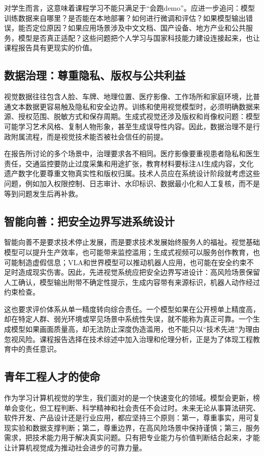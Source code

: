 \documentclass[UTF8,a4paper,12pt]{ctexart}
\begin{document}
对学生而言，这意味着课程学习不能只满足于“会跑demo”。应进一步追问：模型训练数据来自哪里？是否能在本地部署？如何进行微调和评估？如果模型输出错误，能否定位原因？如果应用场景涉及中文文档、国产设备、地方产业和公共服务，模型是否真正适配？这些问题把个人学习与国家科技能力建设连接起来，也让课程报告具有更现实的价值。

\subsection{数据治理：尊重隐私、版权与公共利益}
视觉数据往往包含人脸、车牌、地理位置、医疗影像、工作场所和家庭环境，比普通文本数据更容易触及隐私和安全边界。训练和使用视觉模型时，必须明确数据来源、授权范围、脱敏方式和保存周期。生成式视觉还涉及版权和肖像权问题：模型可能学习艺术风格、复制人物形象，甚至生成误导性内容。因此，数据治理不是行政附属流程，而是视觉技术能否被社会信任的前提。

在报告所讨论的多个场景中，治理要求各不相同。医疗影像要重视患者隐私和医生责任，交通监控要防止过度采集和用途扩张，教育材料要标注AI生成内容，文化遗产数字化要尊重文物真实性和版权归属。技术人员应在系统设计阶段就考虑这些问题，例如加入权限控制、日志审计、水印标识、数据最小化和人工复核，而不是等到问题发生后再补救。

\subsection{智能向善：把安全边界写进系统设计}
智能向善不是要求技术停止发展，而是要求技术发展始终服务人的福祉。视觉基础模型可以提升生产效率，也可能带来监控滥用；生成式视频可以服务创作教育，也可能制造虚假信息；VLA和世界模型可以推动机器人应用，也可能在安全约束不足时造成现实伤害。因此，先进视觉系统应把安全边界写进设计：高风险场景保留人工确认，模型输出附带不确定性提示，生成内容带有来源标识，机器人动作经过约束检查。

这也要求评价体系从单一精度转向综合责任。一个模型如果在公开榜单上精度高，却在特定人群、弱光环境或罕见场景中系统性失误，就不能称为真正可靠。一个生成模型如果画面质量高，却无法防止深度伪造滥用，也不能只以“技术先进”为理由忽视风险。课程报告选择在技术综述中加入治理和伦理分析，正是为了体现工程教育中的责任意识。

\subsection{青年工程人才的使命}
作为学习计算机视觉的学生，我们面对的是一个快速变化的领域。模型会更新，榜单会变化，但工程判断、科学精神和社会责任不会过时。未来无论从事算法研究、软件开发、产品设计还是行业应用，都应坚持三个原则：第一，尊重事实，用可复现实验和数据支撑判断；第二，尊重边界，在高风险场景中保持谨慎；第三，服务需求，把技术能力用于解决真实问题。只有把专业能力与价值判断结合起来，才能让计算机视觉成为推动社会进步的可靠力量。
\end{document}
